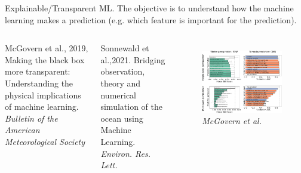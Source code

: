 \documentclass[handout]{beamer}
\newcommand{\rref}[1][]{\hfill{\scriptsize\textit{#1}}}
\begin{document}
\begin{frame}{Explainable/Transparent ML.}
The objective is to understand how the machine learning makes a prediction (e.g. which feature is important for the prediction).

\begin{columns}

{\footnotesize

    McGovern et al., 2019, Making the black box more transparent: Understanding the physical implications of machine learning. {\it Bulletin of the American Meteorological Society}\\
    \vspace{1em}

    Sonnewald  et al.,2021. Bridging observation, theory and numerical simulation of the ocean using Machine Learning. {\it Environ. Res. Lett.} 
    }
    

\begin{figure}
    \centering
    \includegraphics[width=.5\textwidth]{fig/L3/full-bams-d-18-0195.1-f3.jpg}\\
\rref[McGovern et al.]
\end{figure}
\end{columns}

\end{frame}



\end{document}
